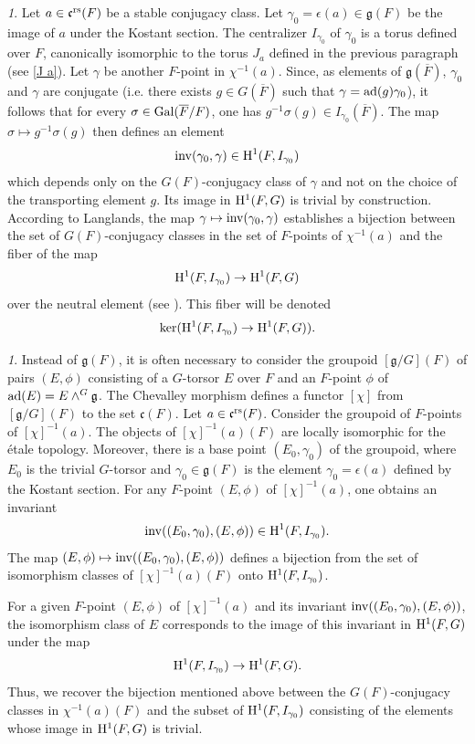 \documentclass[12pt,english]{smfart}
\numberwithin{equation}{subsection}
\theoremstyle{remark}
\newtheorem{numero}[equation]{}
\newcommand\rta{\rightarrow}
\newcommand\frakg{{\mathfrak g}}
\newcommand\frakc{{\mathfrak c}}
\newcommand\rmH{{\rm H}}
\newcommand\Gal{{\rm Gal}}
\newcommand\ad{{\rm ad}}
\newcommand\inv{{\rm inv}}
\newcommand\rs{{\rm rs}}
\begin{document}
\begin{numero}
Let $a\in\frakc^\rs(F)$ be a stable conjugacy class. Let $\gamma_0=\epsilon(a)\in\frakg(F)$ be the image of $a$ under the Kostant section. The centralizer $I_{\gamma_0}$ of $\gamma_0$ is a torus defined over $F$, canonically isomorphic to the torus $J_a$ defined in the previous paragraph (see \ref{J a}). Let $\gamma$ be another $F$-point in $\chi^{-1}(a)$. Since, as elements of $\frakg(\overline F)$, $\gamma_0$ and $\gamma$ are conjugate (i.e. there exists $g\in G(\overline F)$ such that $\gamma=\ad(g) \gamma_0$), it follows that for every $\sigma\in \Gal(\overline F/F)$, one has $g^{-1}\sigma(g)\in I_{\gamma_0}(\overline F)$. The map $\sigma\mapsto g^{-1}\sigma(g)$ then defines an element
$$\inv(\gamma_0,\gamma)\in \rmH^1(F,I_{\gamma_0})$$
which depends only on the $G(F)$-conjugacy class of $\gamma$ and not on the choice of the transporting element $g$. Its image in $\rmH^1(F,G)$ is trivial by construction. According to Langlands, the map $\gamma\mapsto \inv(\gamma_0,\gamma)$ establishes a bijection between the set of $G(F)$-conjugacy classes in the set of $F$-points of $\chi^{-1}(a)$ and the fiber of the map
$$\rmH^1(F,I_{\gamma_0})\rta \rmH^1(F,G)$$
over the neutral element (see \cite{Langlands}). This fiber will be denoted
$${\rm ker}(\rmH^1(F,I_{\gamma_0})\rta \rmH^1(F,G)).$$
\end{numero}

\begin{numero}
Instead of $\frakg(F)$, it is often necessary to consider the groupoid $[\frakg/G](F)$ of pairs $(E,\phi)$ consisting of a $G$-torsor $E$ over $F$ and an $F$-point $\phi$ of $\ad(E)=E\wedge^G \frakg$. The Chevalley morphism defines a functor $[\chi]$ from $[\frakg/G](F)$ to the set $\frakc(F)$. Let $a\in\frakc^\rs(F)$. Consider the groupoid of $F$-points of $[\chi]^{-1}(a)$. The objects of $[\chi]^{-1}(a)(F)$ are locally isomorphic for the \'{e}tale topology. Moreover, there is a base point $(E_0,\gamma_0)$ of the groupoid, where $E_0$ is the trivial $G$-torsor and $\gamma_0\in \frakg(F)$ is the element $\gamma_0=\epsilon(a)$ defined by the Kostant section. For any $F$-point $(E,\phi)$ of $[\chi]^{-1}(a)$, one obtains an invariant
$$\inv((E_0,\gamma_0),(E,\phi))\in \rmH^1(F,I_{\gamma_0}).$$
The map $(E,\phi)\mapsto \inv((E_0,\gamma_0),(E,\phi))$ defines a bijection from the set of isomorphism classes of $[\chi]^{-1}(a)(F)$ onto $\rmH^1(F,I_{\gamma_0})$.

For a given $F$-point $(E,\phi)$ of $[\chi]^{-1}(a)$ and its invariant $\inv((E_0,\gamma_0),(E,\phi))$, the isomorphism class of $E$ corresponds to the image of this invariant in $\rmH^1(F,G)$ under the map
$$\rmH^1(F,I_{\gamma_0})\rightarrow \rmH^1(F,G).$$
Thus, we recover the bijection mentioned above between the $G(F)$-conjugacy classes in $\chi^{-1}(a)(F)$ and the subset of $\rmH^1(F,I_{\gamma_0})$ consisting of the elements whose image in $\rmH^1(F,G)$ is trivial.
\end{numero}
\end{document}
